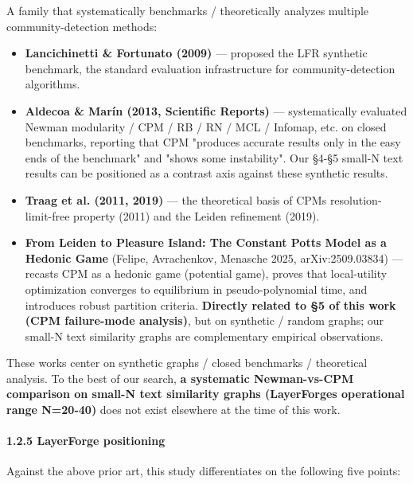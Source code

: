 \documentclass[
]{article}
\providecommand{\tightlist}{%
  \setlength{\itemsep}{0pt}\setlength{\parskip}{0pt}}
\begin{document}
A family that systematically benchmarks / theoretically analyzes
multiple community-detection methods:

\begin{itemize}
\tightlist
\item
  \textbf{Lancichinetti \& Fortunato (2009)} --- proposed the LFR
  synthetic benchmark, the standard evaluation infrastructure for
  community-detection algorithms.
\item
  \textbf{Aldecoa \& Marín (2013, Scientific Reports)} ---
  systematically evaluated Newman modularity / CPM / RB / RN / MCL /
  Infomap, etc. on closed benchmarks, reporting that CPM "produces
  accurate results only in the easy ends of the benchmark" and "shows
  some instability". Our §4-§5 small-N text results can be positioned as
  a contrast axis against these synthetic results.
\item
  \textbf{Traag et al. (2011, 2019)} --- the theoretical basis of
  CPM\textquotesingle s resolution-limit-free property (2011) and the
  Leiden refinement (2019).
\item
  \textbf{From Leiden to Pleasure Island: The Constant Potts Model as a
  Hedonic Game} (Felipe, Avrachenkov, Menasche 2025, arXiv:2509.03834)
  --- recasts CPM as a hedonic game (potential game), proves that
  local-utility optimization converges to equilibrium in
  pseudo-polynomial time, and introduces robust partition criteria.
  \textbf{Directly related to §5 of this work (CPM failure-mode
  analysis)}, but on synthetic / random graphs; our small-N text
  similarity graphs are complementary empirical observations.
\end{itemize}

These works center on synthetic graphs / closed benchmarks / theoretical
analysis. To the best of our search, \textbf{a systematic Newman-vs-CPM
comparison on small-N text similarity graphs
(LayerForge\textquotesingle s operational range N=20-40)} does not exist
elsewhere at the time of this work.

\paragraph{1.2.5 LayerForge
positioning}\label{125-layerforge-positioning}

Against the above prior art, this study differentiates on the following
five points:
\end{document}
